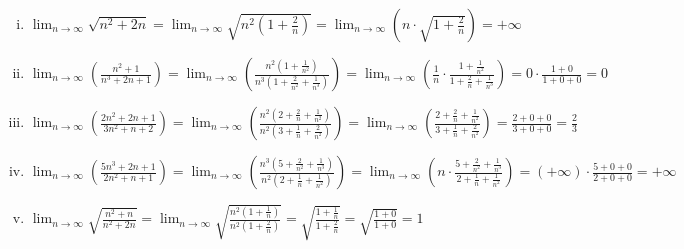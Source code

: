\documentclass[a4paper,table]{report}
\begin{document}
\begin{example}
\item {}
  \begin{enumerate}[i)]
    \item $ \displaystyle 
      \lim_{n \to \infty} \sqrt{n^{2}+2n} = \lim_{n \to \infty} \sqrt{n^{2}\left(1+ 
      \frac{2}{n}\right)} = \lim_{n \to \infty} 
      \left(n \cdot \sqrt{1+ \frac{2}{n}}\right) = +\infty 
      $
    \item $\displaystyle
      \lim_{n \to \infty} \left(\frac{n^{2}+1}{n^{3}+2n+1}\right) = \lim_{n \to \infty}
      \left(\frac{n^{2}(1+ \frac{1}{n^{2}})}{n^{3}(1+ \frac{2}{n^{2}} + 
      \frac{1}{n^{3}})}\right)
      = \lim_{n \to \infty} \left(\frac{1}{n} \cdot \frac{1+ \frac{1}{n^{2}}}{1 +
      \frac{2}{n} + \frac{1}{n^{3}}}\right) = 0 \cdot \frac{1 + 0}{1+0+0} = 0 $

    \item $ \displaystyle
      \lim_{n \to \infty} \left(\frac{2n^{2}+2n+1}{3n^{2}+n+2}\right) = 
      \lim_{n \to \infty}
      \left(\frac{n^{2}(2+ \frac{2}{n} + \frac{1}{n^{2}})}{n^{2}(3+ \frac{1}{n} +
        \frac{2}{n^{2}})}\right) = \lim_{n \to \infty} \left(\frac{2+ \frac{2}{n} +
      \frac{1}{n^{2}}}{3+ \frac{1}{n} + \frac{2}{n^{2}}}\right) = \frac{2+0+0}{3+0+0} 
      = \frac{2}{3} $

    \item $ \displaystyle
      \lim_{n \to \infty} \left(\frac{5n^{3}+2n+1}{2n^{2}+n+1}\right) = 
      \lim_{n \to \infty}
      \left(\frac{n^{3}(5+ \frac{2}{n^{2}} + \frac{1}{n^{3}})}{n^{2}(2+ \frac{1}{n} +
        \frac{1}{n^{2}})}\right) = \lim_{n \to \infty} \left(n \cdot \frac{5 + 
      \frac{2}{n^{2}} + \frac{1}{n^{3}}}{2+ \frac{1}{n} + \frac{1}{n^{2}}}\right) = 
      (+\infty)\cdot \frac{5+0+0}{2+0+0} = + \infty $

    \item $ \displaystyle
      \lim_{n \to \infty} \sqrt{\frac{n^{2}+n}{n^{2}+2n}} = \lim_{n \to \infty}
      \sqrt{\frac{n^{2}(1+ \frac{1}{n})}{n^{2}(1+ \frac{2}{n})}} =
      \sqrt{\frac{1+ \frac{1}{n}}{1+ \frac{2}{n}}} = \sqrt{\frac{1+0}{1+0}} = 1 $
  \end{enumerate}
\end{example}
\end{document}
